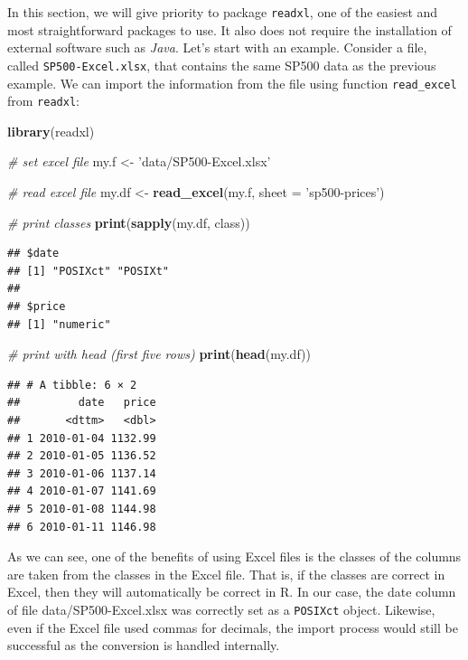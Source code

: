\documentclass[11pt,]{book}
\newenvironment{Shaded}{\begin{snugshade}}{\end{snugshade}}
\newcommand{\KeywordTok}[1]{\textcolor[rgb]{0.27,0.27,0.27}{\textbf{#1}}}
\newcommand{\DataTypeTok}[1]{\textcolor[rgb]{0.27,0.27,0.27}{#1}}
\newcommand{\StringTok}[1]{\textcolor[rgb]{0.5,0.5,0.5}{#1}}
\newcommand{\CommentTok}[1]{\textcolor[rgb]{0.56,0.35,0.01}{\textit{#1}}}
\newcommand{\NormalTok}[1]{#1}
\begin{document}
In this section, we will give priority to package \texttt{readxl}, one
of the easiest and most straightforward packages to use. It also does
not require the installation of external software such as \emph{Java}.
Let's start with an example. Consider a file, called
\texttt{SP500-Excel.xlsx}, that contains the same SP500 data as the
previous example. We can import the information from the file using
function \texttt{read\_excel} from \texttt{readxl}:

\begin{Shaded}
\begin{Highlighting}[]
\KeywordTok{library}\NormalTok{(readxl)}

\CommentTok{# set excel file}
\NormalTok{my.f <-}\StringTok{ 'data/SP500-Excel.xlsx'}

\CommentTok{# read excel file }
\NormalTok{my.df <-}\StringTok{ }\KeywordTok{read_excel}\NormalTok{(my.f, }\DataTypeTok{sheet =} \StringTok{'sp500-prices'}\NormalTok{)}

\CommentTok{# print classes}
\KeywordTok{print}\NormalTok{(}\KeywordTok{sapply}\NormalTok{(my.df, class))}
\end{Highlighting}
\end{Shaded}

\begin{verbatim}
## $date
## [1] "POSIXct" "POSIXt" 
## 
## $price
## [1] "numeric"
\end{verbatim}

\begin{Shaded}
\begin{Highlighting}[]
\CommentTok{# print with head (first five rows)}
\KeywordTok{print}\NormalTok{(}\KeywordTok{head}\NormalTok{(my.df))}
\end{Highlighting}
\end{Shaded}

\begin{verbatim}
## # A tibble: 6 × 2
##         date   price
##       <dttm>   <dbl>
## 1 2010-01-04 1132.99
## 2 2010-01-05 1136.52
## 3 2010-01-06 1137.14
## 4 2010-01-07 1141.69
## 5 2010-01-08 1144.98
## 6 2010-01-11 1146.98
\end{verbatim}

As we can see, one of the benefits of using Excel files is the classes
of the columns are taken from the classes in the Excel file. That is, if
the classes are correct in Excel, then they will automatically be
correct in R. In our case, the date column of file data/SP500-Excel.xlsx
was correctly set as a \texttt{POSIXct} object. Likewise, even if the
Excel file used commas for decimals, the import process would still be
successful as the conversion is handled internally.
\end{document}
